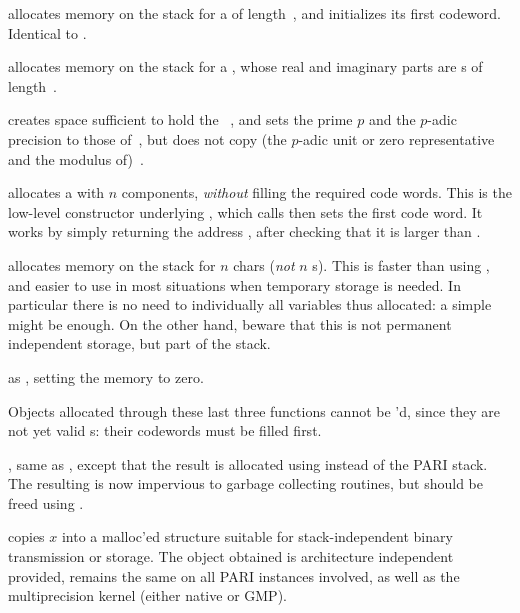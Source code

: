 allocates memory on the stack for a 
of length~, and initializes its first codeword. Identical to
.

 allocates memory on the stack for a
, whose real and imaginary parts are s
of length~.

 creates space sufficient to hold the
~, and sets the prime $p$ and the $p$-adic precision to
those of~, but does not copy (the $p$-adic unit or zero representative
and the modulus of)~.

 allocates a  with $n$ components,
\emph{without} filling the required code words. This is the low-level
constructor underlying , which calls  then sets
the first code word. It works by simply returning the address
, after checking that it is larger than .

 allocates memory on the stack for $n$
chars (\emph{not} $n$ s). This is faster than using ,
and easier to use in most situations when temporary storage is needed. In
particular there is no need to  individually all variables thus
allocated: a simple  might be enough. On the other hand,
beware that this is not permanent independent storage, but part of the stack.

 as , setting the memory
to zero.

\noindent Objects allocated through these last three functions cannot be
'd, since they are not yet valid s: their codewords
must be filled first.

, same as , except
that the result is allocated using  instead of the PARI
stack. The resulting  is now impervious to garbage collecting
routines, but should be freed using .


 copies $x$ into a malloc'ed structure suitable
for stack-independent binary transmission or storage. The object obtained
is architecture independent provided,  remains the same
on all PARI instances involved, as well as the multiprecision kernel (either
native or GMP).

